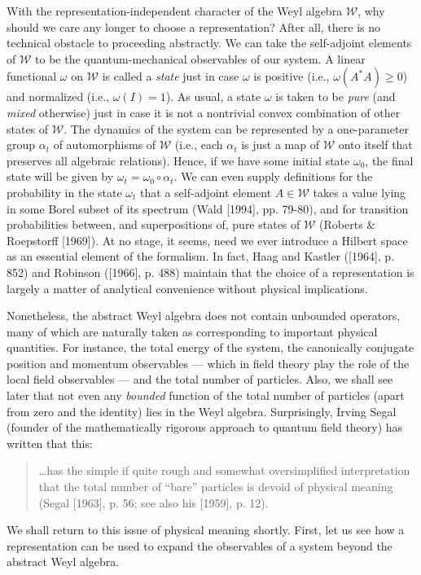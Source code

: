 \documentclass[12pt]{article}
\theoremstyle{remark}
\theoremstyle{definition}
\newcommand{\alg}[1]{\mathcal{#1}}
\begin{document}
With the representation-independent character of the Weyl algebra
$\alg{W}$, why should we care any longer to choose a representation?  
After all, there is no technical obstacle to 
proceeding abstractly.  We can take the self-adjoint elements of $\alg{W}$ 
to be the quantum-mechanical observables of our system.  
A linear functional $\omega$ on $\alg{W}$ is
called a \emph{state} just in case $\omega$ is positive (i.e., $\omega
(A^{*}A)\geq 0$) and normalized (i.e., $\omega (I)=1$).  As usual, a 
state $\omega$ is taken to be \emph{pure} (and \emph{mixed} 
otherwise) just in case it is not a 
nontrivial convex combination of other states of $\alg{W}$.  The dynamics
of the system can be represented by a one-parameter group $\alpha _{t}$ of
automorphisms of $\alg{W}$ (i.e., each $\alpha _{t}$ is just a map
of $\alg{W}$ onto itself that preserves all algebraic relations).  
Hence, if we have some 
initial state $\omega_{0}$, the final state will be given by 
$\omega_{t}=\omega_{0}\circ \alpha _{t}$.   We 
can even supply definitions for the probability in the state 
$\omega_{t}$ 
that a self-adjoint element $A\in\alg{W}$ takes a value lying in some 
Borel
subset of its spectrum (Wald [1994], pp. 79-80), and for 
transition probabilities between, and superpositions of, pure states 
of 
$\alg{W}$ (Roberts \& Roepstorff [1969]).  
At no stage, it seems, need we ever 
introduce a Hilbert space as 
an essential element of the formalism. 
In fact, 
Haag and Kastler ([1964], p. 852) and Robinson ([1966], p. 
488) maintain that the choice of a 
representation is largely a matter of analytical convenience without 
physical implications.

Nonetheless, the abstract Weyl algebra does not contain
unbounded operators, many of which are naturally taken as
corresponding to important physical quantities.  For instance, 
the total energy of the system, the canonically conjugate position and momentum 
observables --- which in field theory play the role of the local field 
observables --- and the total
number of particles.  Also, we shall see later that not even any 
\emph{bounded} function of the total number of particles (apart from 
zero and the identity) 
lies in the Weyl algebra.  Surprisingly, Irving Segal (founder of the 
mathematically rigorous approach 
to quantum field theory) has written that this: 
\begin{quote}
\ldots has the simple if quite
rough and somewhat oversimplified interpretation that the total number of
``bare'' particles is devoid of physical meaning (Segal [1963], p. 
56; see also his [1959], p. 12). 
\end{quote}
\noindent We shall return to this issue of 
physical meaning shortly.  First, let us see how a 
representation can be used to 
expand the observables of a system beyond the abstract Weyl algebra. 
\end{document}
